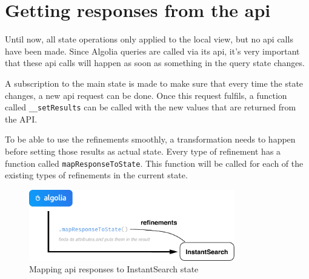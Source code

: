 
\section{Getting responses from the \acrshort{api}} %
\label{sec:getting_responses_from_the_api}

Until now, all state operations only applied to the local view, but no \acrshort{api} calls have been made. Since Algolia queries are called via its \acrshort{api}, it's very important that these \acrshort{api} calls will happen as soon as something in the query state changes. 

A subscription to the main state is made to make sure that every time the state changes, a new \acrshort{api} request can be done. Once this request fulfils, a function called {\tt \_\_setResults} can be called with the new values that are returned from the API.

To be able to use the refinements smoothly, a transformation needs to happen before setting those results as actual state. Every type of refinement has a function called {\tt mapResponseToState}. This function will be called for each of the existing types of refinements in the current state.

\begin{figure}[H]
  \centering
  \includegraphics[width=0.8\textwidth]{../assets/results-to-state.pdf}
  \caption{Mapping \acrshort{api} responses to InstantSearch state}
  \label{figure:results-to-state}
\end{figure}

